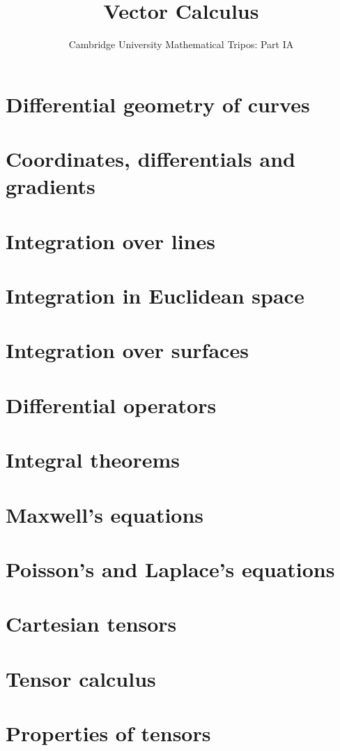 \documentclass{article}
\title{Vector Calculus}
\author{Cambridge University Mathematical Tripos: Part IA}
\begin{document}
\maketitle

\tableofcontentsnewpage{}

\section{Differential geometry of curves}

\section{Coordinates, differentials and gradients}

\section{Integration over lines}

\section{Integration in Euclidean space}

\section{Integration over surfaces}

\section{Differential operators}

\section{Integral theorems}

\section{Maxwell's equations}

\section{Poisson's and Laplace's equations}

\section{Cartesian tensors}

\section{Tensor calculus}

\section{Properties of tensors}

\end{document}
